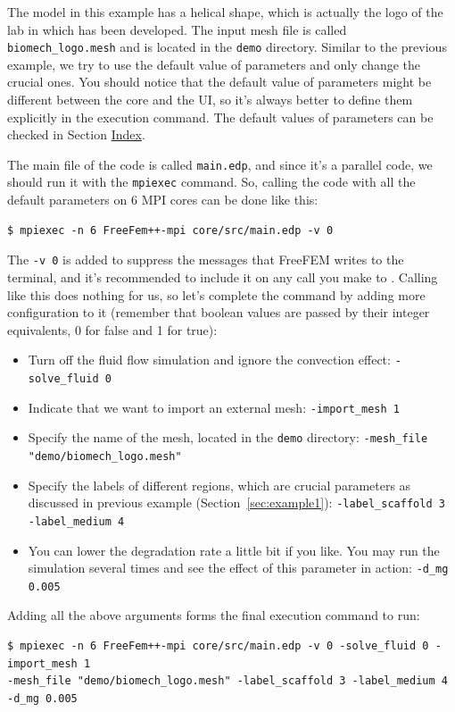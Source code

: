 The model in this example has a helical shape, which is actually the logo of the lab in which \biodeg{} has been developed. The input mesh file is called \verb|biomech_logo.mesh| and is located in the \verb|demo| directory. Similar to the previous example, we try to use the default value of parameters and only change the crucial ones. You should notice that the default value of parameters might be different between the core \biodeg{} and the UI, so it's always better to define them explicitly in the execution command. The default values of parameters can be checked in Section  \hyperref[sec:index]{Index}.

The main file of the \biodeg{} code is called \verb|main.edp|, and since it's a parallel code, we should run it with the \verb|mpiexec| command. So, calling the code with all the default parameters on 6 MPI cores can be done like this:
\begin{verbatim}
$ mpiexec -n 6 FreeFem++-mpi core/src/main.edp -v 0
\end{verbatim}

The \verb|-v 0| is added to suppress the messages that FreeFEM writes to the terminal, and it's recommended to include it on any call you make to \biodeg{}. Calling \biodeg{} like this does nothing for us, so let's complete the command by adding more configuration to it (remember that boolean values are passed by their integer equivalents, 0 for false and 1 for true):

\begin{itemize}
\item
Turn off the fluid flow simulation and ignore the convection effect: \verb|-solve_fluid 0|
\item
Indicate that we want to import an external mesh: \verb|-import_mesh 1|
\item
Specify the name of the mesh, located in the \verb|demo| directory: \verb|-mesh_file "demo/biomech_logo.mesh"|
\item
Specify the labels of different regions, which are crucial parameters as discussed in previous example (Section~\ref{sec:example1}): \verb|-label_scaffold 3 -label_medium 4|
\item
You can lower the degradation rate a little bit if you like. You may run the simulation several times and see the effect of this parameter in action: \verb|-d_mg 0.005|
\end{itemize}

Adding all the above arguments forms the final execution command to run:
\begin{verbatim}
$ mpiexec -n 6 FreeFem++-mpi core/src/main.edp -v 0 -solve_fluid 0 -import_mesh 1
-mesh_file "demo/biomech_logo.mesh" -label_scaffold 3 -label_medium 4 -d_mg 0.005
\end{verbatim}

